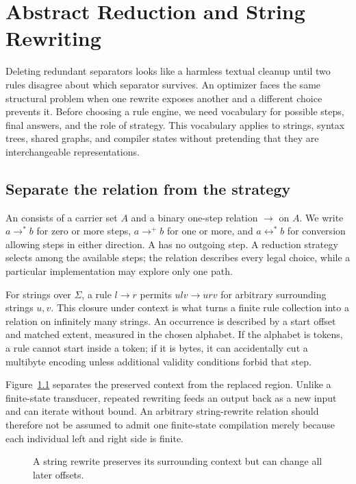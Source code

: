 \chapter{Abstract Reduction and String Rewriting}
\label{ch:abstract-string-rewriting}

Deleting redundant separators looks like a harmless textual cleanup until two rules disagree about which separator survives.
An optimizer faces the same structural problem when one rewrite exposes another and a different choice prevents it.
Before choosing a rule engine, we need vocabulary for possible steps, final answers, and the role of strategy.
This vocabulary applies to strings, syntax trees, shared graphs, and compiler states without pretending that they are interchangeable representations.

\section{Separate the relation from the strategy}
\label{sec:ch81-reduction}
An  consists of a carrier set $A$ and a binary one-step relation $\to$ on $A$.
We write $a\to^*b$ for zero or more steps, $a\to^+b$ for one or more, and $a\leftrightarrow^*b$ for conversion allowing steps in either direction.
A  has no outgoing step.
A reduction strategy selects among the available steps; the relation describes every legal choice, while a particular implementation may explore only one path.

For strings over $\Sigma$, a rule $l\to r$ permits $ulv\to urv$ for arbitrary surrounding strings $u,v$.
This closure under context is what turns a finite rule collection into a relation on infinitely many strings.
An occurrence is described by a start offset and matched extent, measured in the chosen alphabet.
If the alphabet is tokens, a rule cannot start inside a token; if it is bytes, it can accidentally cut a multibyte encoding unless additional validity conditions forbid that step.

Figure~\ref{fig:ch81-context} separates the preserved context from the replaced region.
Unlike a finite-state transducer, repeated rewriting feeds an output back as a new input and can iterate without bound.
An arbitrary string-rewrite relation should therefore not be assumed to admit one finite-state compilation merely because each individual left and right side is finite.

\begin{figure}[htbp]
\centering
{}
\caption{A string rewrite preserves its surrounding context but can change all later offsets.}
\label{fig:ch81-context}
\end{figure}

